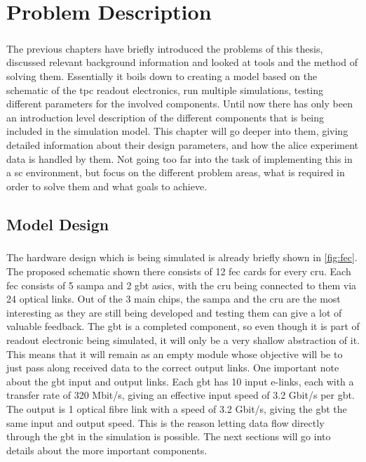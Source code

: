 \documentclass[a4paper, 12pt, openright, twoside]{report}
\begin{document}
\chapter{Problem Description}
\label{cha:4}

\paragraph{}
The previous chapters have briefly introduced the problems of this thesis, discussed relevant background information and looked at tools and the method of solving them.
Essentially it boils down to creating a model based on the schematic of the \gls{tpc} readout electronics, run multiple simulations, testing different parameters for the involved components.
Until now there has only been an introduction level description of the different components that is being included in the simulation model.
This chapter will go deeper into them, giving detailed information about their design parameters, and how the \gls{alice} experiment data is handled by them.
Not going too far into the task of implementing this in a \gls{sc} environment, but focus on the different problem areas, what is required in order to solve them and what goals to achieve.

\section{Model Design}
\paragraph{}
The hardware design which is being simulated is already briefly shown in \ref{fig:fec}.
The proposed schematic shown there consists of 12 \gls{fec} cards for every \gls{cru}.
Each \gls{fec} consists of 5 \gls{sampa} and 2 \gls{gbt} \glspl{asic}, with the \gls{cru} being connected to them via 24 optical links.
Out of the 3 main chips, the \gls{sampa} and the \gls{cru} are the most interesting as they are still being developed and testing them can give a lot of valuable feedback.
The \gls{gbt} is a completed component, so even though it is part of readout electronic being simulated, it will only be a very shallow abstraction of it.
This means that it will remain as an empty module whose objective will be to just pass along received data to the correct output links.
One important note about the \gls{gbt} input and output links.
Each \gls{gbt} has 10 input e-links, each with a transfer rate of 320 Mbit/s, giving an effective input speed of 3.2 Gbit/s per \gls{gbt}.
The output is 1 optical fibre link with a speed of 3.2 Gbit/s, giving the \gls{gbt} the same input and output speed.
This is the reason letting data flow directly through the \gls{gbt} in the simulation is possible.
The next sections will go into details about the more important components.
\end{document}

